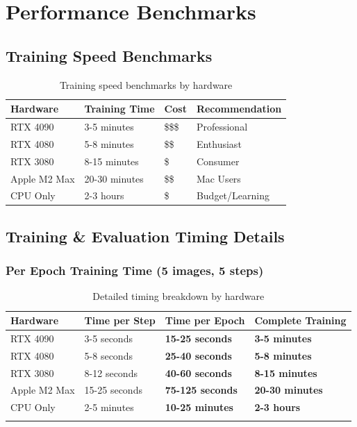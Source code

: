 \documentclass[11pt,a4paper]{article}
\begin{document}
\section{Performance Benchmarks}

\subsection{Training Speed Benchmarks}

\begin{table}[h]
\centering
\begin{tabular}{@{}llll@{}}
\toprule
\textbf{Hardware} & \textbf{Training Time} & \textbf{Cost} & \textbf{Recommendation} \\
\midrule
RTX 4090 & 3-5 minutes & \$\$\$ & Professional \\
RTX 4080 & 5-8 minutes & \$\$ & Enthusiast \\
RTX 3080 & 8-15 minutes & \$ & Consumer \\
Apple M2 Max & 20-30 minutes & \$\$ & Mac Users \\
CPU Only & 2-3 hours & \$ & Budget/Learning \\
\bottomrule
\end{tabular}
\caption{Training speed benchmarks by hardware}
\end{table}

\subsection{Training \& Evaluation Timing Details}

\subsubsection{Per Epoch Training Time (5 images, 5 steps)}

\begin{longtable}{@{}llll@{}}
\toprule
\textbf{Hardware} & \textbf{Time per Step} & \textbf{Time per Epoch} & \textbf{Complete Training} \\
\midrule
\endhead
RTX 4090 & 3-5 seconds & \textbf{15-25 seconds} & \textbf{3-5 minutes} \\
RTX 4080 & 5-8 seconds & \textbf{25-40 seconds} & \textbf{5-8 minutes} \\
RTX 3080 & 8-12 seconds & \textbf{40-60 seconds} & \textbf{8-15 minutes} \\
Apple M2 Max & 15-25 seconds & \textbf{75-125 seconds} & \textbf{20-30 minutes} \\
CPU Only & 2-5 minutes & \textbf{10-25 minutes} & \textbf{2-3 hours} \\
\bottomrule
\caption{Detailed timing breakdown by hardware}
\end{longtable}
\end{document}
